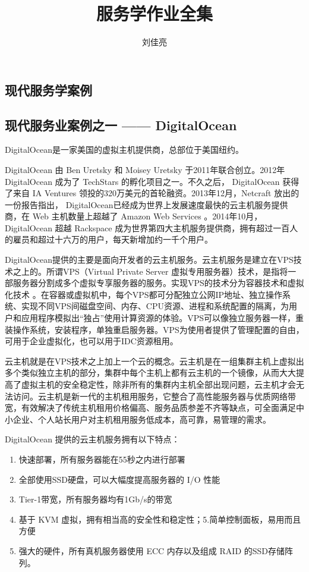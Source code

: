 \documentclass[11pt,a4paper]{article}
\begin{document}
\begin{CJK}{UTF8}{gbsn}                       %

\title{服务学作业全集}
\author{刘佳亮}
\maketitle
\newpage
\renewcommand{\contentsname}{目录}
\tableofcontents
\newpage

\section{现代服务学案例}

\subsection{现代服务业案例之一 —— DigitalOcean}

DigitalOcean是一家美国的虚拟主机提供商，总部位于美国纽约。

DigitalOcean 由 Ben Uretsky 和 Moisey Uretsky 于2011年联合创立。2012年 DigitalOcean 成为了 TechStars 的孵化项目之一。不久之后， DigitalOcean 获得了来自 IA Ventures 领投的320万美元的首轮融资。2013年12月，Netcraft 放出的一份报告指出， DigitalOcean已经成为世界上发展速度最快的云主机服务提供商，在 Web 主机数量上超越了 Amazon Web Services 。2014年10月， DigitalOcean 超越 Rackspace 成为世界第四大主机服务提供商，拥有超过一百人的雇员和超过十六万的用户，每天新增加约一千个用户。

DigitalOcean提供的主要是面向开发者的云主机服务。云主机服务是建立在VPS技术之上的。所谓VPS（Virtual Private Server 虚拟专用服务器）技术，是指将一部服务器分割成多个虚拟专享服务器的服务。实现VPS的技术分为容器技术和虚拟化技术 。在容器或虚拟机中，每个VPS都可分配独立公网IP地址、独立操作系统、实现不同VPS间磁盘空间、内存、CPU资源、进程和系统配置的隔离，为用户和应用程序模拟出“独占”使用计算资源的体验。VPS可以像独立服务器一样，重装操作系统，安装程序，单独重启服务器。VPS为使用者提供了管理配置的自由，可用于企业虚拟化，也可以用于IDC资源租用。

云主机就是在VPS技术之上加上一个云的概念。云主机是在一组集群主机上虚拟出多个类似独立主机的部分，集群中每个主机上都有云主机的一个镜像，从而大大提高了虚拟主机的安全稳定性，除非所有的集群内主机全部出现问题，云主机才会无法访问。云主机是新一代的主机租用服务，它整合了高性能服务器与优质网络带宽，有效解决了传统主机租用价格偏高、服务品质参差不齐等缺点，可全面满足中小企业、个人站长用户对主机租用服务低成本，高可靠，易管理的需求。

DigitalOcean 提供的云主机服务拥有以下特点：
\begin{enumerate}
\item 快速部署，所有服务器能在55秒之内进行部署
\item 全部使用SSD硬盘，可以大幅度提高服务器的 I/O 性能
\item Tier-1带宽，所有服务器均有1Gb/s的带宽
\item 基于 KVM  虚拟，拥有相当高的安全性和稳定性；5.简单控制面板，易用而且方便
\item 强大的硬件，所有真机服务器使用 ECC 内存以及组成 RAID 的SSD存储阵列。


\end{enumerate}
\end{CJK}
\end{document}

